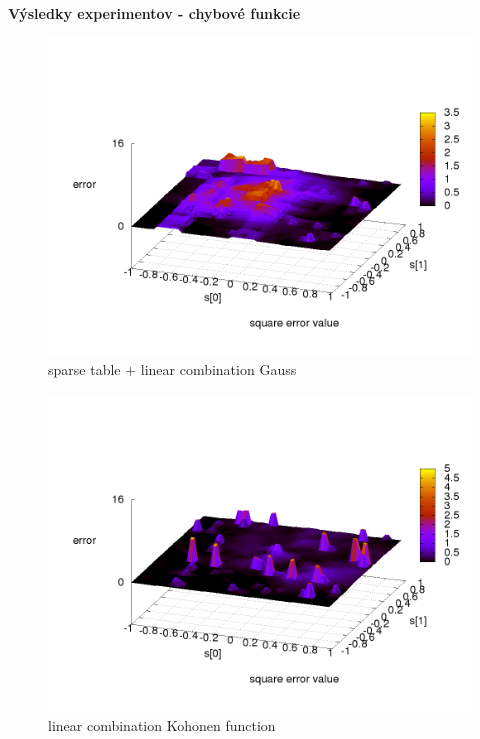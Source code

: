 \documentclass[xcolor=dvipsnames]{beamer}
\begin{document}
\begin{frame}{\bf Výsledky experimentov - chybové funkcie}

\begin{minipage}{.5\textwidth}

\begin{figure}[!htb]
\centering
\includegraphics[scale=.2]{../../results_q_learning/map_1/function_type_3/q_learning_error.png}
\caption{sparse table + linear combination Gauss}
\end{figure}


\end{minipage}%
\begin{minipage}{.5\textwidth}

\begin{figure}[!htb]
\centering
\includegraphics[scale=.2]{../../results_q_learning/map_1/function_type_4/q_learning_error.png}
\caption{linear combination Kohonen function}
\end{figure}


\end{minipage}
\end{frame}
\end{document}
